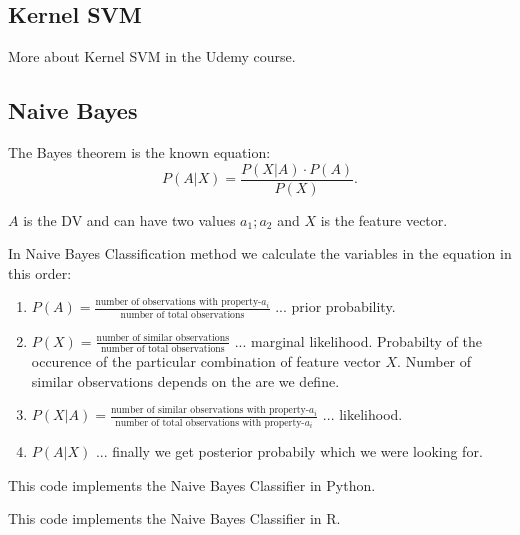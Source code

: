 \documentclass[runningheads,a4paper]{llncs}
\begin{document}
\subsection{Kernel SVM}

More about Kernel SVM in the Udemy course.

\subsection{Naive Bayes}


The Bayes theorem is the known equation: 
\begin{equation}
P(A|X) = \frac{P(X|A) \cdot P(A)}{P(X)}.
\end{equation}

$A$ is the DV and can have two values $a_1; a_2$ and $X$ is the feature vector. 

In Naive Bayes Classification method we calculate the variables in the equation in this order:

\begin{enumerate}
\item $P(A)= \frac{\text{number of observations with property-} a_i}{\text{number of total observations}}$ ... prior probability. 
\item $P(X) = \frac{\text{number of similar observations}}{\text{number of total observations}}$ ... marginal likelihood. Probabilty of the occurence of the particular combination of feature vector $X$. Number of similar observations depends on the are we define.
\item $P(X|A) = \frac{\text{number of similar observations with property-} a_i}{\text{number of total observations with property-} a_i}$ ... likelihood. 
\item $P(A|X)$ ... finally we get posterior probabily which we were looking for.
\end{enumerate}

This code implements the Naive Bayes Classifier in Python.
 


This code implements the Naive Bayes Classifier in R.
 
\end{document}
